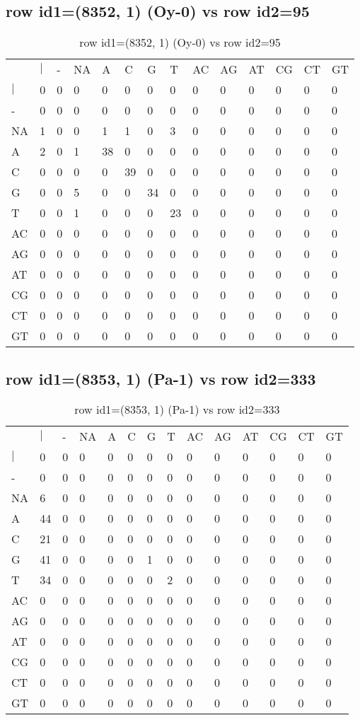 \subsection{row id1=(8352, 1) (Oy-0) vs row id2=95}
\begin{center}
\begin{longtable}{|l|l|l|l|l|l|l|l|l|l|l|l|l|l|}
\caption{row id1=(8352, 1) (Oy-0) vs row id2=95} \label{table_dm368}\\
\hline
\\
\hline
&$|$&-&NA&A&C&G&T&AC&AG&AT&CG&CT&GT\\
$|$&0&0&0&0&0&0&0&0&0&0&0&0&0\\
-&0&0&0&0&0&0&0&0&0&0&0&0&0\\
NA&1&0&0&1&1&0&3&0&0&0&0&0&0\\
A&2&0&1&38&0&0&0&0&0&0&0&0&0\\
C&0&0&0&0&39&0&0&0&0&0&0&0&0\\
G&0&0&5&0&0&34&0&0&0&0&0&0&0\\
T&0&0&1&0&0&0&23&0&0&0&0&0&0\\
AC&0&0&0&0&0&0&0&0&0&0&0&0&0\\
AG&0&0&0&0&0&0&0&0&0&0&0&0&0\\
AT&0&0&0&0&0&0&0&0&0&0&0&0&0\\
CG&0&0&0&0&0&0&0&0&0&0&0&0&0\\
CT&0&0&0&0&0&0&0&0&0&0&0&0&0\\
GT&0&0&0&0&0&0&0&0&0&0&0&0&0\\
\hline
\end{longtable}
\end{center}

\subsection{row id1=(8353, 1) (Pa-1) vs row id2=333}
\begin{center}
\begin{longtable}{|l|l|l|l|l|l|l|l|l|l|l|l|l|l|}
\caption{row id1=(8353, 1) (Pa-1) vs row id2=333} \label{table_dm370}\\
\hline
\\
\hline
&$|$&-&NA&A&C&G&T&AC&AG&AT&CG&CT&GT\\
$|$&0&0&0&0&0&0&0&0&0&0&0&0&0\\
-&0&0&0&0&0&0&0&0&0&0&0&0&0\\
NA&6&0&0&0&0&0&0&0&0&0&0&0&0\\
A&44&0&0&0&0&0&0&0&0&0&0&0&0\\
C&21&0&0&0&0&0&0&0&0&0&0&0&0\\
G&41&0&0&0&0&1&0&0&0&0&0&0&0\\
T&34&0&0&0&0&0&2&0&0&0&0&0&0\\
AC&0&0&0&0&0&0&0&0&0&0&0&0&0\\
AG&0&0&0&0&0&0&0&0&0&0&0&0&0\\
AT&0&0&0&0&0&0&0&0&0&0&0&0&0\\
CG&0&0&0&0&0&0&0&0&0&0&0&0&0\\
CT&0&0&0&0&0&0&0&0&0&0&0&0&0\\
GT&0&0&0&0&0&0&0&0&0&0&0&0&0\\
\hline
\end{longtable}
\end{center}


